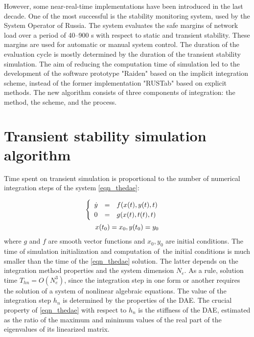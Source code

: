 \documentclass[lettersize,journal]{IEEEtran}
\begin{document}
However, some near-real-time implementations have been introduced in the last decade. One of the most successful is the stability monitoring system, used by the System Operator of Russia. The system evaluates the safe margins of network load over a period of 40–900 s with respect to static and transient stability. These margins are used for automatic or manual system control. The duration of the evaluation cycle is mostly determined by the duration of the transient stability simulation. The aim of reducing the computation time of simulation led to the development of the software prototype "Raiden" based on the implicit integration scheme, instead of the former implementation "RUSTab" based on explicit methods. The new algorithm consists of three components of integration: the method, the scheme, and the process. 
\section{Transient stability simulation algorithm}
Time spent on transient simulation is proportional to the number of numerical integration steps of the system \eqref{eqn_thedae}: 

\begin{equation}
	\label{eqn_thedae}
	\begin{array}{c}
		\begin{cases}
			\begin{array}{lcl}
				\dot{y}&=&f(x(t), y(t), t) \\
			 	      0&=&g(x(t), t(t), t)\\
			\end{array}
		\end{cases} 
	\vspace{0.5em} \\
	 x(t_0)=x_0, y(t_0)=y_0 \\
	\end{array}
\end{equation}
\noindent where \(g\) and \(f\) are smooth vector functions and \(x_0, y_0\) are initial conditions. The time of simulation initialization and computation of the initial conditions is much smaller than the time of the \eqref{eqn_thedae} solution. The latter depends on the integration method properties and the system dimension \(N_e\). As a rule, solution time \(T_{hn}=O(N_e^3)\), since the integration step in one form or another requires the solution of a system of nonlinear algebraic equations. The value of the integration step \(h_n\) is determined by the properties of the DAE. The crucial property of \eqref{eqn_thedae} with respect to \(h_n\) is the stiffness of the DAE, estimated as the ratio of the maximum and minimum values of the real part of the eigenvalues of its linearized matrix. 
\end{document}
